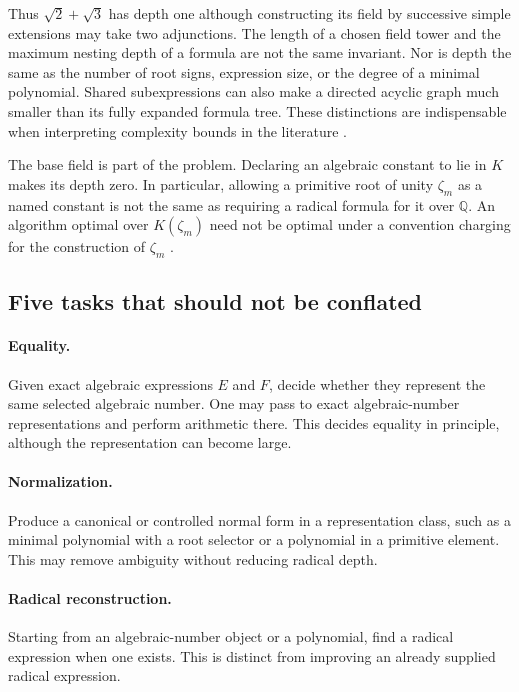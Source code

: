 \documentclass[11pt,letterpaper]{article}
\numberwithin{equation}{section}
\theoremstyle{definition}
\theoremstyle{remark}
\newcommand{\Q}{\mathbb{Q}}
\begin{document}
Thus $\sqrt2+\sqrt3$ has depth one although constructing its field by successive simple extensions may take two adjunctions. The length of a chosen field tower and the maximum nesting depth of a formula are not the same invariant. Nor is depth the same as the number of root signs, expression size, or the degree of a minimal polynomial. Shared subexpressions can also make a directed acyclic graph much smaller than its fully expanded formula tree. These distinctions are indispensable when interpreting complexity bounds in the literature \cite{bfht,blomerthesis,jeffrey}.

The base field is part of the problem. Declaring an algebraic constant to lie in $K$ makes its depth zero. In particular, allowing a primitive root of unity $\zeta_m$ as a named constant is not the same as requiring a radical formula for it over $\Q$. An algorithm optimal over $K(\zeta_m)$ need not be optimal under a convention charging for the construction of $\zeta_m$ \cite{landau,hornghuang,honsbeek}.

\subsection{Five tasks that should not be conflated}
\paragraph{Equality.} Given exact algebraic expressions $E$ and $F$, decide whether they represent the same selected algebraic number. One may pass to exact algebraic-number representations and perform arithmetic there. This decides equality in principle, although the representation can become large.

\paragraph{Normalization.} Produce a canonical or controlled normal form in a representation class, such as a minimal polynomial with a root selector or a polynomial in a primitive element. This may remove ambiguity without reducing radical depth.

\paragraph{Radical reconstruction.} Starting from an algebraic-number object or a polynomial, find a radical expression when one exists. This is distinct from improving an already supplied radical expression.
\end{document}
